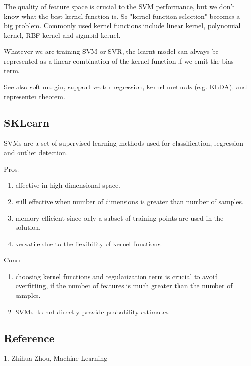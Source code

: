 The quality of feature space is crucial to the SVM performance, but we don't
know what the best kernel function is. So "kernel function selection" becomes a
big problem.  Commonly used kernel functions include linear kernel, polynomial
kernel, RBF kernel and sigmoid kernel.

Whatever we are training SVM or SVR, the learnt model can always be represented
as a linear combination of the kernel function if we omit the bias term.

See also soft margin, support vector regression, kernel methods (e.g. KLDA),
and representer theorem.

\subsection{SKLearn}

SVMs are a set of supervised learning methods used for classification, regression
and outlier detection.

Pros: \begin{enumerate}
\item effective in high dimensional space.
\item still effective when number of dimensions is greater than number of samples.
\item memory efficient since only a subset of training points are used in the solution.
\item versatile due to the flexibility of kernel functions.
\end{enumerate}

Cons: \begin{enumerate}
\item choosing kernel functions and regularization term is crucial to
	avoid overfitting, if the number of features is much greater than the number of samples.
\item SVMs do not directly provide probability estimates.
\end{enumerate}

\subsection{Reference}

1. Zhihua Zhou, Machine Learning.
